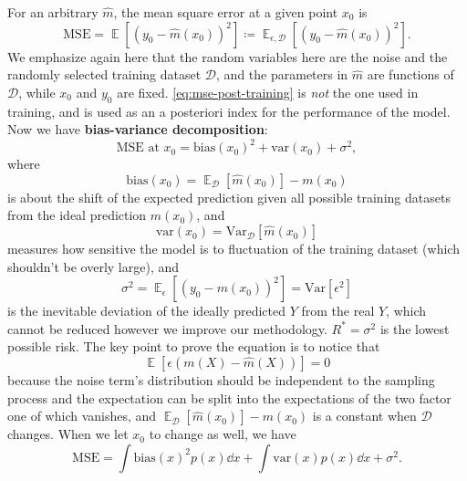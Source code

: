 \documentclass[hyperref, a4paper]{article}
\DeclareMathOperator{\expect}{\mathbb{E}}
\newcommand*{\concept}[1]{{\textbf{#1}}}
\begin{document}
For an arbitrary $\hat{m}$, the mean square error at a given point $x_0$ is 
\begin{equation}
    \text{MSE} = \expect[(y_0 - \hat{m}(x_0))^2] \coloneqq \expect_{\epsilon, \mathcal{D}}[(y_0 - \hat{m}(x_0))^2].
    \label{eq:mse-post-training}
\end{equation}
We emphasize again here that the random variables here 
are the noise and the randomly selected training dataset $\mathcal{D}$,
and the parameters in $\hat{m}$ are functions of $\mathcal{D}$,
while $x_0$ and $y_0$ are fixed.
\eqref{eq:mse-post-training} is \emph{not} the one used in training,
and is used as an a posteriori index for the performance of the model.
Now we have \concept{bias-variance decomposition}:
\begin{equation}
    \text{MSE at $x_0$} = \mathrm{bias}(x_0)^2 
    + \mathrm{var}(x_0) + \sigma^2,
\end{equation}
where 
\begin{equation}
    \mathrm{bias}(x_0) = \expect_{\mathcal{D}}[\hat{m}(x_0)] - m(x_0)
\end{equation}
is about the shift of the expected prediction given all possible training datasets
from the ideal prediction $m(x_0)$, and
\begin{equation}
    \mathrm{var}(x_0) = \mathrm{Var}_{\mathcal{D}}[\hat{m}(x_0)] 
\end{equation}
measures how sensitive the model is to fluctuation of the training dataset
(which shouldn't be overly large),
and 
\begin{equation}
    \sigma^2 = \expect_\epsilon[(y_0 - m(x_0))^2] = \mathrm{Var}[\epsilon^2]
\end{equation}
is the inevitable deviation of the ideally predicted $Y$ from the real $Y$,
which cannot be reduced however we improve our methodology.
$R^* = \sigma^2$ is the lowest possible risk.
The key point to prove the equation is to notice that 
\begin{equation}
    \expect[\epsilon (m(X) - \hat{m}(X))] = 0
\end{equation}
because the noise term's distribution should be independent to the sampling process
and the expectation can be split into the expectations of the two factor
one of which vanishes, and $\expect_{\mathcal{D}}[\hat{m}(x_0)] - m(x_0)$ is a constant
when $\mathcal{D}$ changes.
When we let $x_0$ to change as well, we have
\begin{equation}
    \text{MSE} = \int \mathrm{bias}(x)^2 p(x) \dd{x} 
    + \int \mathrm{var}(x) p(x) \dd{x} + \sigma^2.
\end{equation}
\end{document}
